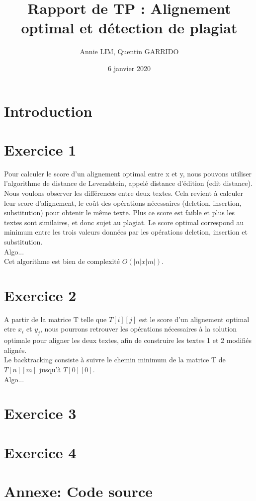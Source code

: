\documentclass{article}
\title{Rapport de TP : Alignement optimal et détection de plagiat}
\author{Annie LIM, Quentin GARRIDO}
\date{6 janvier 2020}
\begin{document}
\maketitle
\tableofcontents
\pagebreak

\section{Introduction}


\section{Exercice 1}

Pour calculer le score d'un alignement optimal entre x et y, nous pouvons utiliser
l'algorithme de distance de Levenshtein, appelé distance d'édition (edit distance).
Nous voulons observer les différences entre deux textes. Cela revient à calculer 
leur score d'alignement, le coût des opérations nécessaires (deletion, insertion,
substitution) pour obtenir le même texte. Plus ce score est faible et plus les textes
sont similaires, et donc sujet au plagiat.
Le score optimal correspond au minimum entre les trois valeurs données par les opérations
deletion, insertion et substitution. \\
Algo...\\
Cet algorithme est bien de complexité $O(|n|x|m|)$.


\section{Exercice 2}

A partir de la matrice T telle que $T[i][j]$ est le score d'un alignement
optimal etre $x_{i}$ et $y_{j}$, nous pourrons retrouver les opérations
nécessaires à la solution optimale pour aligner les deux textes, afin de
construire les textes 1 et 2 modifiés alignés.\\
Le backtracking consiste à suivre le chemin minimum de la matrice T de
$T[n][m]$ jusqu'à $T[0][0]$.\\
Algo...\\

\section{Exercice 3}


\section{Exercice 4}



\section{Annexe: Code source}
		
\end{document}
